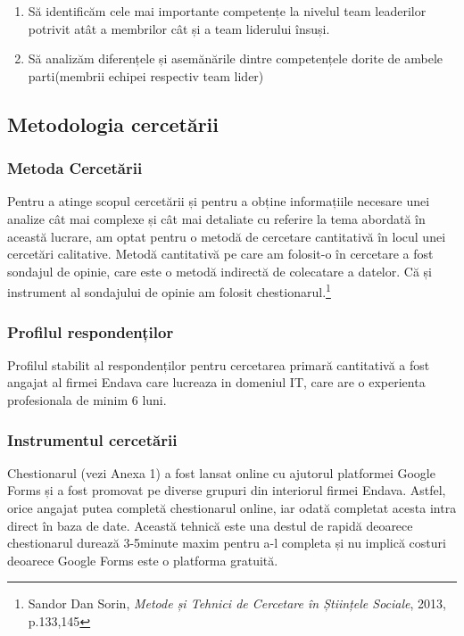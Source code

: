 \documentclass[a4paper, 12pt]{article}
\begin{document}
	\begin{enumerate}[(1)]
		\item Să identificăm cele mai importante competențe la nivelul team leaderilor potrivit atât a membrilor cât și a team liderului însuși.

		\item Să analizăm diferențele și asemănările dintre competențele dorite de ambele parti(membrii echipei respectiv team lider)

	\end{enumerate}

	\subsection{Metodologia cercetării}

		\subsubsection{Metoda Cercetării}
	\qquad\space Pentru a atinge scopul cercetării și pentru a obține informațiile necesare unei analize cât mai complexe și cât mai detaliate cu referire la tema abordată în această lucrare, am optat pentru o metodă de cercetare cantitativă în locul unei cercetări calitative.
	\quad Metodă cantitativă pe care am folosit-o în cercetare a fost sondajul de opinie, care este o metodă indirectă de colecatare a datelor. Că și instrument al sondajului de opinie am folosit chestionarul.\footnote{Sandor Dan Sorin, \textit{Metode și Tehnici de Cercetare în Științele Sociale}, 2013, p.133,145}

		\subsubsection{Profilul respondenților}
	\quad Profilul stabilit al respondenților pentru cercetarea primară cantitativă a fost angajat al firmei Endava care lucreaza in domeniul IT, care are  o experienta profesionala de minim 6 luni.
		
	\subsubsection{Instrumentul cercetării}

	\quad Chestionarul (vezi Anexa 1) a fost lansat online cu ajutorul platformei Google Forms și a fost promovat  pe diverse grupuri din interiorul firmei Endava. Astfel, orice angajat putea completă chestionarul online, iar odată completat acesta intra direct în baza de date. Această tehnică este una destul de rapidă deoarece chestionarul durează 3-5minute maxim pentru a-l completa și nu implică costuri deoarece Google Forms este o platforma gratuită.
\end{document}
